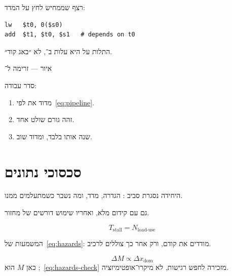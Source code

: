 רצף שממחיש לחץ על המדד:
\begin{asmblock}
\begin{lstlisting}[style=asm]
lw   $t0, 0($s0)
add  $t1, $t0, $s1   # depends on t0
\end{lstlisting}
\end{asmblock}
התלות על  היא עלות ב־, לא ״באג קוד״.

\begin{tikzpic}
\end{tikzpic}
\begin{center}\small איור — זרימה ל־\end{center}

סדר עבודה:
\begin{enumerate}
\item[(\textbf{א})] מדוד את  לפי~\eqref{eq:pipeline}.
\item[(\textbf{ב})] זהה גורם שולט אחד.
\item[(\textbf{ג})] שנה אותו בלבד, ומדוד שוב.
\end{enumerate}

\chapter{סכסוכי נתונים}
\label{ch:hazards}

היחידה נסגרת סביב : הגדרה, מדד, ומה נשבר כשמתעלמים ממנו.

\begin{warnbox}[frametitle={מלכודת — סכסוכי נתונים}]
גם עם קידום מלא,  ואחריו שימוש דורשים  של מחזור.
\end{warnbox}

\begin{equation}
\label{eq:hazards}
T_{\mathrm{stall}}=N_{\mathrm{load\text{-}use}}
\end{equation}

המשמעות של~\eqref{eq:hazards}: מודדים את  קודם, ורק אחר כך צוללים לרכיב.

\begin{equation}
\label{eq:hazards-check}
\Delta M \propto \Delta x_{\mathrm{dom}}
\end{equation}
כאן $M$ הוא ;~\eqref{eq:hazards-check} מזכירה לחפש רגישות, לא מיקרו־אופטימיזציה.


